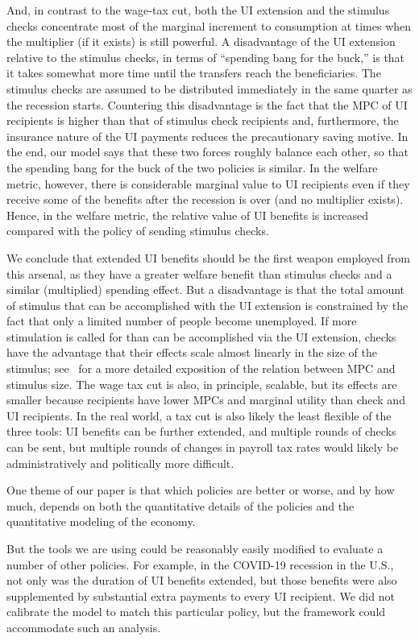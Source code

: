 \documentclass[\latexroot/\projectname]{subfiles}
\begin{document}
And, in contrast to the wage-tax cut, both the UI extension and the stimulus checks concentrate most of the marginal increment to consumption at times when the multiplier (if it exists) is still powerful.  A disadvantage of the UI extension relative to the stimulus checks, in terms of ``spending bang for the buck,'' is that it takes somewhat more time until the transfers reach the beneficiaries. The stimulus checks are assumed to be distributed immediately in the same quarter as the recession starts. Countering this disadvantage is the fact that the MPC of UI recipients is higher than that of stimulus check recipients and, furthermore, the insurance nature of the UI payments reduces the precautionary saving motive. In the end, our model says that these two forces roughly balance each other, so that the spending bang for the buck of the two policies is similar. In the welfare metric, however, there is considerable marginal value to UI recipients even if they receive some of the benefits after the recession is over (and no multiplier exists). Hence, in the welfare metric, the relative value of UI benefits is increased compared with the policy of sending stimulus checks.

We conclude that extended UI benefits should be the first weapon employed from this arsenal, as they have a greater welfare benefit than stimulus checks and a similar (multiplied) spending effect.  But a disadvantage is that the total amount of stimulus that can be accomplished with the UI extension is constrained by the fact that only a limited number of people become unemployed.  If more stimulation is called for than can be accomplished via the UI extension, checks have the advantage that their effects scale almost linearly in the size of the stimulus; see~\cite{beraja2024size} for a more detailed exposition of the relation between MPC and stimulus size.  The wage tax cut is also, in principle, scalable, but its effects are smaller because recipients have lower MPCs and marginal utility than check and UI recipients.  In the real world, a tax cut is also likely the least flexible of the three tools:  UI benefits can be further extended, and multiple rounds of checks can be sent, but multiple rounds of changes in payroll tax rates would likely be administratively and politically more difficult.

One theme of our paper is that which policies are better or worse, and by how much, depends on both the quantitative details of the policies and the quantitative modeling of the economy.

But the tools we are using could be reasonably easily modified to evaluate a number of other policies.  For example, in the COVID-19 recession in the U.S., not only was the duration of UI benefits extended, but those benefits were also supplemented by substantial extra payments to every UI recipient.  We did not calibrate the model to match this particular policy, but the framework could accommodate such an analysis.

\smartbib
\end{document}

